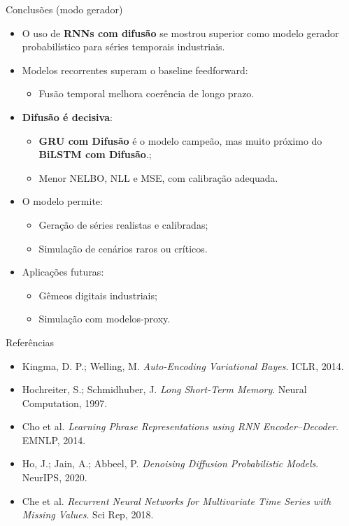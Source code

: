 \documentclass[10pt,aspectratio=169]{beamer}
\begin{document}
\begin{frame}{Conclusões (modo gerador)}
  \begin{itemize}
    \item O uso de \textbf{RNNs com difusão} se mostrou superior como modelo gerador
          probabilístico para séries temporais industriais.

    \item Modelos recorrentes superam o baseline feedforward:
      \begin{itemize}
           \item Fusão temporal melhora coerência de longo prazo.
      \end{itemize}

    \item \textbf{Difusão é decisiva}:
      \begin{itemize}
        \item \textbf{GRU com Difusão} é o modelo campeão, mas muito próximo do \textbf{BiLSTM com Difusão}.;
        \item Menor NELBO, NLL e MSE, com calibração adequada.
      \end{itemize}

    \item O modelo permite:
      \begin{itemize}
        \item Geração de séries realistas e calibradas;
        \item Simulação de cenários raros ou críticos.
      \end{itemize}

    \item Aplicações futuras:
      \begin{itemize}
        \item Gêmeos digitais industriais;
        \item Simulação com modelos-proxy.
      \end{itemize}
  \end{itemize}
\end{frame}



\begin{frame}{Referências}

\begin{itemize}
  \item Kingma, D. P.; Welling, M. \textit{Auto-Encoding Variational Bayes}. ICLR, 2014.
  \item Hochreiter, S.; Schmidhuber, J. \textit{Long Short-Term Memory}. Neural Computation, 1997.
  \item Cho et al. \textit{Learning Phrase Representations using RNN Encoder–Decoder}. EMNLP, 2014.
  \item Ho, J.; Jain, A.; Abbeel, P. \textit{Denoising Diffusion Probabilistic Models}. NeurIPS, 2020.
  \item Che et al. \textit{Recurrent Neural Networks for Multivariate Time Series with Missing Values}. Sci Rep, 2018.
\end{itemize}

\end{frame}
\end{document}
